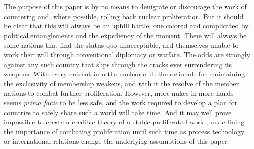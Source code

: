 \documentclass[journal]{IEEEtran}
\begin{document}
The purpose of this paper is by no means to denigrate or discourage the work of countering and, where possible, rolling back nuclear proliferation.  But it should be clear that this will always be an uphill battle, one colored and complicated by political entanglements and the expediency of the moment.  There will always be some nations that find the status quo unacceptable, and themselves unable to work their will through conventional diplomacy or warfare.   The odds are strongly against any such country that slips through the cracks ever surrendering its weapons.  With every entrant into the nuclear club the rationale for maintaining the exclusivity of membership weakens, and with it the resolve of the member nations to combat further proliferation.  However, more nukes in more hands seems \textit{prima facie} to be less safe, and the work required to develop a plan for countries to safely share such a world will take time.  And it may well prove impossible to create a credible theory of a stable proliferated world, underlining the importance of combating proliferation until such time as process technology or international relations change the underlying assumptions of this paper.
\newpage


%
%

\end{document}
